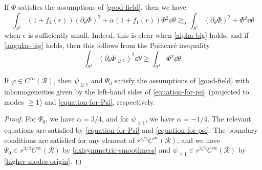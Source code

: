 \documentclass[10pt, reqno]{amsart}
\begin{document}
\begin{remark}
If \(\Phi{}\) satisfies the assumptions of \cref{good-field}, then we have
\begin{equation}
\int _{S^1}(1 + f_2(r))(\partial{}_\theta{}\Phi{})^2 + \alpha{}(1+f_1(r))\Phi{}^2 \dd{}\theta{}\gtrsim _\alpha{} \int _{S^1} (\partial{}_\theta{}\Phi{})^2 + \Phi{}^2\dd{}\theta{}
\end{equation}
when \(\epsilon{}\) is sufficiently small. Indeed, this is clear when \cref{alpha-big}
holds, and if \cref{angular-big} holds, then this follows from the Poincaré
inequality
\begin{equation}
\int _{S^1}(\partial{}_\theta{}\Phi{}_{\ge 1})^2\dd{}\theta{} \ge \int _{S^1}\Phi{}^2\dd{}\theta{}.
\end{equation}
\label{effective-zo}
\end{remark}
\begin{lemma}
If \(\varphi{}\in C^\infty(\mathcal{R})\), then \(\psi_{\ge 1}\) and \(\Psi_0\) satisfy the assumptions
of \cref{good-field} with inhomogeneities given by the left-hand sides of
\cref{equation-for-psi} (projected to modes \(\ge 1\)) and \cref{equation-for-Psi},
respectively.
\label{good-field-criterion}
\end{lemma}
\begin{proof}
For \(\Psi_0\), we have \(\alpha{} = 3/4\), and for \(\psi_{\ge 1}\), we have \(\alpha{} = -1/4\). The
relevant equations are satisfied by \cref{equation-for-Psi} and
\cref{equation-for-psi}. The boundary conditions are satisfied for any element of
\(r^{3/2}C^\infty(\mathcal{R})\), and we have \(\Psi_0\in
r^{3/2}C^\infty(\mathcal{R})\) by \cref{axisymmetric-smoothness} and \(\psi_{\ge 1}\in
r^{3/2}C^\infty(\mathcal{R})\) by \cref{higher-modes-origin}.
\end{proof}
\end{document}
